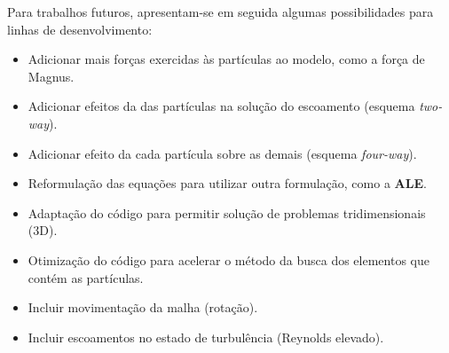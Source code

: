 Para trabalhos futuros, apresentam-se em seguida algumas possibilidades para linhas de desenvolvimento:
\begin{itemize}
	\item Adicionar mais forças exercidas às partículas ao modelo, como a força de Magnus.
	\item Adicionar efeitos da das partículas na solução do escoamento (esquema \textit{two-way}).
	\item Adicionar efeito da cada partícula sobre as demais (esquema \textit{four-way}).
	\item Reformulação das equações para utilizar outra formulação, como a \textbf{ALE}.
	\item Adaptação do código para permitir solução de problemas tridimensionais (3D).
	\item Otimização do código para acelerar o método da busca dos elementos que contém as partículas.
	\item Incluir movimentação da malha (rotação).
	\item Incluir escoamentos no estado de turbulência (Reynolds elevado).
\end{itemize}
